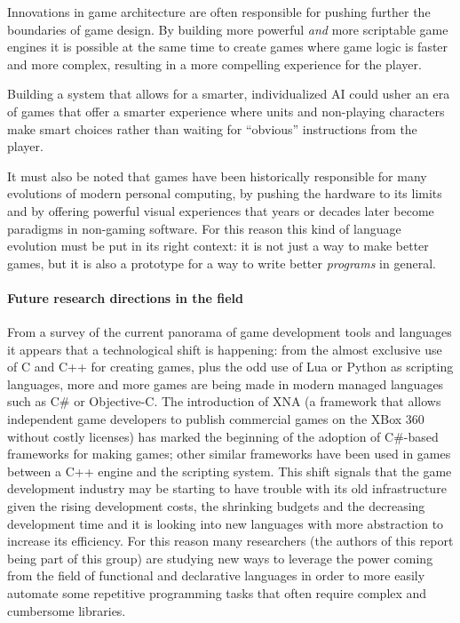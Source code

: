 %
%

Innovations in game architecture are often responsible for pushing further the boundaries of game design. By building more powerful \textit{and} more scriptable game engines it is possible at the same time to create games where game logic is faster and more complex, resulting in a more compelling experience for the player.

Building a system that allows for a smarter, individualized AI could usher an era of games that offer a smarter experience where units and non-playing characters make smart choices rather than waiting for ``obvious'' instructions from the player.

It must also be noted that games have been historically responsible for many evolutions of modern personal computing, by pushing the hardware to its limits and by offering powerful visual experiences that years or decades later become paradigms in non-gaming software. For this reason this kind of language evolution must be put in its right context: it is not just a way to make better games, but it is also a prototype for a way to write better \textit{programs} in general.

\paragraph{Future research directions in the field}
From a survey of the current panorama of game development tools and languages it appears that a technological shift is happening: from the almost exclusive use of C and C++ for creating games, plus the odd use of Lua or Python as scripting languages, more and more games are being made in modern managed languages such as C\# or Objective-C. The introduction of XNA (a framework that allows independent game developers to publish commercial games on the XBox 360 without costly licenses) has marked the beginning of the adoption of C\#-based frameworks for making games; other similar frameworks have been used in games between a C++ engine and the scripting system. This shift signals that the game development industry may be starting to have trouble with its old infrastructure given the rising development costs, the shrinking budgets and the decreasing development time and it is looking into new languages with more abstraction to increase its efficiency. For this reason many researchers (the authors of this report being part of this group) are studying new ways to leverage the power coming from the field of functional and declarative languages in order to more easily automate some repetitive programming tasks that often require complex and cumbersome libraries.